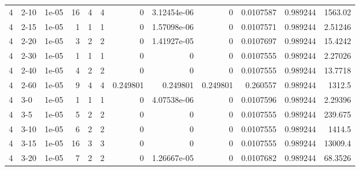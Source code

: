 \begin{tabular}{rlrrrrrrrrrr}
     4 & 2-10   &      1e-05 &          16 &                 4 &                 4 &     0           &     3.12454e-06 &      0           &        0.0107587 &               0.989244 &        1563.02     \\
     4 & 2-15   &      1e-05 &           1 &                 1 &                 1 &     0           &     1.57098e-06 &      0           &        0.0107571 &               0.989244 &           2.51246  \\
     4 & 2-20   &      1e-05 &           3 &                 2 &                 2 &     0           &     1.41927e-05 &      0           &        0.0107697 &               0.989244 &          15.4242   \\
     4 & 2-30   &      1e-05 &           1 &                 1 &                 1 &     0           &     0           &      0           &        0.0107555 &               0.989244 &           2.27026  \\
     4 & 2-40   &      1e-05 &           4 &                 2 &                 2 &     0           &     0           &      0           &        0.0107555 &               0.989244 &          13.7718   \\
     4 & 2-60   &      1e-05 &           9 &                 4 &                 4 &     0.249801    &     0.249801    &      0.249801    &        0.260557  &               0.989244 &        1312.5      \\
     4 & 3-0    &      1e-05 &           1 &                 1 &                 1 &     0           &     4.07538e-06 &      0           &        0.0107596 &               0.989244 &           2.29396  \\
     4 & 3-5    &      1e-05 &           5 &                 2 &                 2 &     0           &     0           &      0           &        0.0107555 &               0.989244 &         239.675    \\
     4 & 3-10   &      1e-05 &           6 &                 2 &                 2 &     0           &     0           &      0           &        0.0107555 &               0.989244 &        1414.5      \\
     4 & 3-15   &      1e-05 &          16 &                 3 &                 3 &     0           &     0           &      0           &        0.0107555 &               0.989244 &       13009.4      \\
     4 & 3-20   &      1e-05 &           7 &                 2 &                 2 &     0           &     1.26667e-05 &      0           &        0.0107682 &               0.989244 &          68.3526   \\

\end{tabular}
